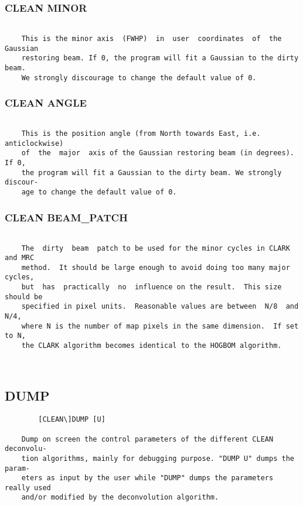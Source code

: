 \subsubsection{CLEAN MINOR}
\begin{verbatim}

    This is the minor axis  (FWHP)  in  user  coordinates  of  the  Gaussian
    restoring beam. If 0, the program will fit a Gaussian to the dirty beam.
    We strongly discourage to change the default value of 0.

\end{verbatim}
\subsubsection{CLEAN ANGLE}
\begin{verbatim}

    This is the position angle (from North towards East, i.e. anticlockwise)
    of  the  major  axis of the Gaussian restoring beam (in degrees).  If 0,
    the program will fit a Gaussian to the dirty beam. We strongly  discour-
    age to change the default value of 0.

\end{verbatim}
\subsubsection{CLEAN BEAM\_PATCH}
\begin{verbatim}

    The  dirty  beam  patch to be used for the minor cycles in CLARK and MRC
    method.  It should be large enough to avoid doing too many major cycles,
    but  has  practically  no  influence on the result.  This size should be
    specified in pixel units.  Reasonable values are between  N/8  and  N/4,
    where N is the number of map pixels in the same dimension.  If set to N,
    the CLARK algorithm becomes identical to the HOGBOM algorithm.



\end{verbatim}
\subsection{DUMP}
\begin{verbatim}
        [CLEAN\]DUMP [U]

    Dump on screen the control parameters of the different CLEAN  deconvolu-
    tion algorithms, mainly for debugging purpose. "DUMP U" dumps the param-
    eters as input by the user while "DUMP" dumps the parameters really used
    and/or modified by the deconvolution algorithm.

\end{verbatim}
